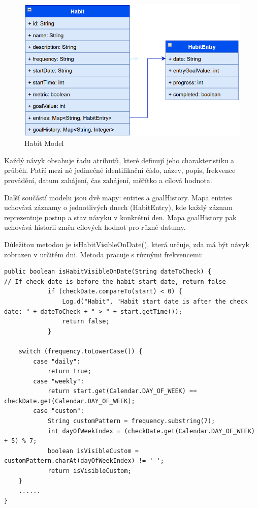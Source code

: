 \begin{figure}[H]
    \centering
    \includegraphics[width=1\linewidth]{images/HABIT.png}
    \caption{Habit Model}
    \label{fig:habit-model}
\end{figure}

Každý návyk obsahuje řadu atributů, které definují jeho charakteristiku a průběh. Patří mezi ně jedinečné identifikační číslo, název, popis, frekvence provádění, datum zahájení, čas zahájení, měřítko a cílová hodnota.

Další součástí modelu jsou dvě mapy: entries a goalHistory. Mapa entries uchovává záznamy o jednotlivých dnech (HabitEntry), kde každý záznam reprezentuje postup a stav návyku v konkrétní den. Mapa goalHistory pak uchovává historii změn cílových hodnot pro různé datumy.

Důležitou metodou je isHabitVisibleOnDate(), která určuje, zda má být návyk zobrazen v určitém dni. Metoda pracuje s různými frekvencemi:

\newpage
\begin{lstlisting}[style=javastyle,caption = {isHabitVisibleOnDate},label = {lst:isHabitVisibleOnDate}]
public boolean isHabitVisibleOnDate(String dateToCheck) {
// If check date is before the habit start date, return false
            if (checkDate.compareTo(start) < 0) {
                Log.d("Habit", "Habit start date is after the check date: " + dateToCheck + " > " + start.getTime());
                return false;
            }

    switch (frequency.toLowerCase()) {
        case "daily":
            return true; 
        case "weekly":
            return start.get(Calendar.DAY_OF_WEEK) == checkDate.get(Calendar.DAY_OF_WEEK);
        case "custom":
            String customPattern = frequency.substring(7);
            int dayOfWeekIndex = (checkDate.get(Calendar.DAY_OF_WEEK) + 5) % 7;
            boolean isVisibleCustom = customPattern.charAt(dayOfWeekIndex) != '-';
            return isVisibleCustom;
    }
    ......
}
\end{lstlisting}

